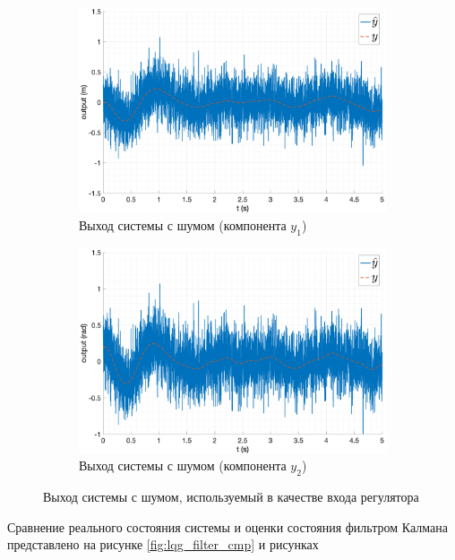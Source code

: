 \begin{figure}[ht!]
    \begin{subfigure}[b]{0.45\textwidth}
        \centering
        \includegraphics[width=\textwidth]{media/plots/LQG/observer_y1_cmp_1.png}
        \caption{Выход системы с шумом (компонента $y_1$)}
    \end{subfigure}
    \begin{subfigure}[b]{0.45\textwidth}
        \centering
        \includegraphics[width=\textwidth]{media/plots/LQG/observer_y2_cmp_1.png}
        \caption{Выход системы с шумом (компонента $y_2$)}
    \end{subfigure}
    \caption{Выход системы с шумом, используемый в качестве входа регулятора}
    \label{fig:lqg_filter_y}
\end{figure}
\FloatBarrier
Сравнение реального состояния системы и оценки состояния фильтром Калмана представлено на рисунке \ref{fig:lqg_filter_cmp} и рисунках 
